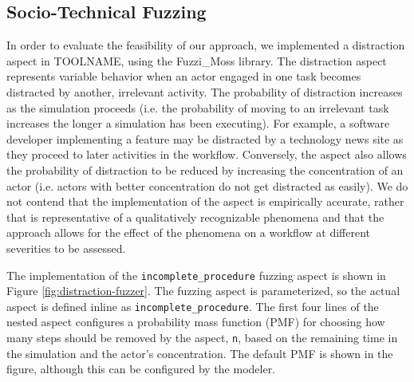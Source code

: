\documentclass{llncs}
\begin{document}

\subsection{Socio-Technical Fuzzing}


In order to evaluate the feasibility of our approach, we implemented a distraction aspect in TOOLNAME, using the
Fuzzi\_Moss library.  The distraction aspect represents variable behavior when an actor engaged in one task becomes
distracted by another, irrelevant activity.  The probability of distraction increases as the simulation proceeds
(i.e. the probability of moving to an irrelevant task increases the longer a simulation has been executing).  For
example, a software developer implementing a feature may be distracted by a technology news site as they proceed to
later activities in the workflow.  Conversely, the aspect also allows the probability of distraction to be reduced by
increasing the concentration of an actor (i.e. actors with better concentration do not get distracted as easily).  We do
not contend that the implementation of the aspect is empirically accurate, rather that is representative of a
qualitatively recognizable phenomena and that the approach allows for the effect of the phenomena on a workflow at
different severities to be assessed.

The implementation of the \lstinline!incomplete_procedure! fuzzing aspect is shown in Figure
\ref{fig:distraction-fuzzer}.  The fuzzing aspect is parameterized, so the actual aspect is defined inline as
\lstinline!incomplete_procedure!.  The first four lines of the nested aspect configures a probability mass function
(PMF) for choosing how many steps should be removed by the aspect, \lstinline!n!, based on the remaining time in the
simulation and the actor's concentration. The default PMF is shown in the figure, although this can be configured by the
modeler.
\end{document}
